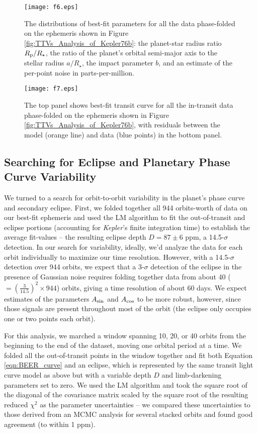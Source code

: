 \documentclass[manuscript]{aastex62}
\newcommand{\kepler}{{\it Kepler}}
\begin{document}
\begin{figure}
    \texttt{[image: f6.eps]}
    \caption{The distributions of best-fit parameters for all the data phase-folded on the ephemeris shown in Figure \ref{fig:TTVs_Analysis_of_Kepler76b}: the planet-star radius ratio $R_{\rm p}/R_\star$, the ratio of the planet's orbital semi-major axis to the stellar radius $a/R_\star$, the impact parameter $b$, and an estimate of the per-point noise in parts-per-million.}
    \label{fig:folded-transit-corner-plot_Analysis-of-Kepler76b}
\end{figure}

\begin{figure}
    \texttt{[image: f7.eps]}
    \caption{The top panel shows best-fit transit curve for all the in-transit data phase-folded on the ephemeris shown in Figure \ref{fig:TTVs_Analysis_of_Kepler76b}, with residuals between the model (orange line) and data (blue points) in the bottom panel.\label{fig:final_best_fit_transit_Analysis_of_Kepler76b}}
\end{figure}

\subsection{Searching for Eclipse and Planetary Phase Curve Variability}
\label{sec:Searching}
We turned to a search for orbit-to-orbit variability in the planet's phase curve and secondary eclipse. First, we folded together all 944 orbits-worth of data on our best-fit ephemeris and used the LM algorithm to fit the out-of-transit and eclipse portions (accounting for \kepler's finite integration time) to establish the average fit-values -- the resulting eclipse depth $D = 87 \pm 6$ ppm, a 14.5-$\sigma$ detection. In our search for variability, ideally, we'd analyze the data for each orbit individually to maximize our time resolution. However, with a 14.5-$\sigma$ detection over 944 orbits, we expect that a 3-$\sigma$ detection of the eclipse in the presence of Gaussian noise requires folding together data from about 40 ($=\left( \frac{3}{14.5} \right)^2 \times 944 $) orbits, giving a time resolution of about 60 days. We expect estimates of the parameters $A_{\rm sin}$ and $A_{\rm cos}$ to be more robust, however, since those signals are present throughout most of the orbit (the eclipse only occupies one or two points each orbit). 

For this analysis, we marched a window spanning 10, 20, or 40 orbits from the beginning to the end of the dataset, moving one orbital period at a time. We folded all the out-of-transit points in the window together and fit both Equation \ref{eqn:BEER_curve} and an eclipse, which is represented by the same transit light curve model as above but with a variable depth $D$ and limb-darkening parameters set to zero. We used the LM algorithm and took the square root of the diagonal of the covariance matrix scaled by the square root of the resulting reduced $\chi^2$ as the parameter uncertainties -- we compared these uncertainties to those derived from an MCMC analysis for several stacked orbits and found good agreement (to within 1 ppm). 
\end{document}
